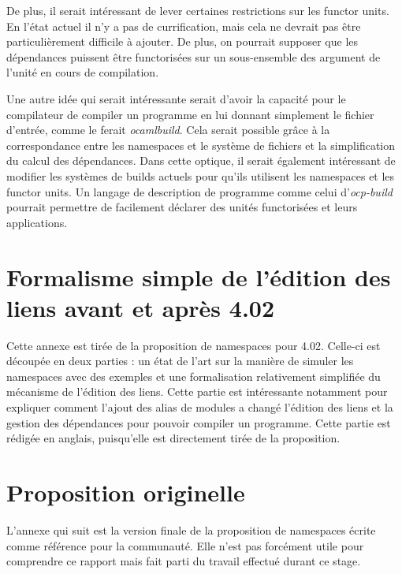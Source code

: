\documentclass[11pt,a4paper]{report}
\begin{document}
De plus, il serait intéressant de lever certaines restrictions sur les functor
units. En l'état actuel il n'y a pas de currification, mais cela ne devrait pas
être particulièrement difficile à ajouter. De plus, on pourrait supposer que les
dépendances puissent être functorisées sur un sous-ensemble des argument de
l'unité en cours de compilation.

Une autre idée qui serait intéressante serait d'avoir la capacité pour le
compilateur de compiler un programme en lui donnant simplement le fichier
d'entrée, comme le ferait \emph{ocamlbuild}. Cela serait possible grâce à la
correspondance entre les namespaces et le système de fichiers et la
simplification du calcul des dépendances. Dans cette optique, il serait
également intéressant de modifier les systèmes de builds actuels pour qu'ils
utilisent les namespaces et les functor units. Un langage de description de
programme comme celui d'\emph{ocp-build} pourrait permettre de facilement
déclarer des unités functorisées et leurs applications.




\appendix

\chapter{Formalisme simple de l'édition des liens avant et après 4.02}
\label{appendix-soa}

Cette annexe est tirée de la proposition de namespaces pour 4.02. Celle-ci est
découpée en deux parties : un état de l'art sur la manière de simuler les
namespaces avec des exemples et une formalisation relativement simplifiée du
mécanisme de l'édition des liens. Cette partie est intéressante notamment pour
expliquer comment l'ajout des alias de modules a changé l'édition des liens et
la gestion des dépendances pour pouvoir compiler un programme. Cette partie est
rédigée en anglais, puisqu'elle est directement tirée de la proposition.




\chapter{Proposition originelle}

L'annexe qui suit est la version finale de la proposition de namespaces écrite
comme référence pour la communauté. Elle n'est pas forcément utile pour
comprendre ce rapport mais fait parti du travail effectué durant ce stage.


\end{document}
